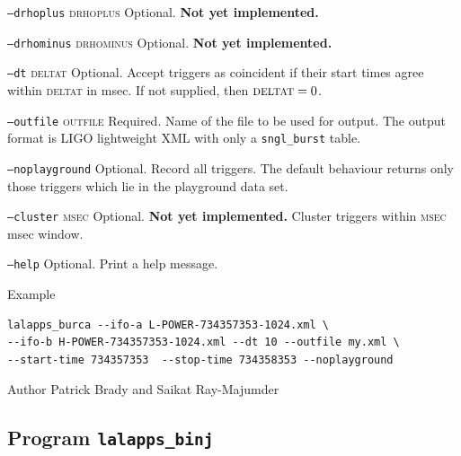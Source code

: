 \begin{entry}
\begin{entry}
\item[\texttt{--drhoplus} \textsc{drhoplus}] Optional.  \textbf{Not yet
implemented.}

\item[\texttt{--drhominus} \textsc{drhominus}] Optional. \textbf{Not yet
implemented.}

\item[\texttt{--dt} \textsc{deltat}] Optional. Accept triggers as coincident if
their start times agree within \textsc{deltat} in msec.  If not supplied,  then 
$\textsc{deltat} = 0$.

\item[\texttt{--outfile} \textsc{outfile}] Required.  Name of the file
to be used for output.  The output format is LIGO lightweight XML with
only a \texttt{sngl\_burst} table.

\item[\texttt{--noplayground}] Optional.  Record all triggers.  The
default behaviour returns only those triggers which lie in the
playground data set.  

\item[\texttt{--cluster} \textsc{msec}] Optional.  \textbf{Not yet
implemented.}  Cluster triggers within \textsc{msec} msec window.

\item[\texttt{--help}] Optional.  Print a help message.
\end{entry}

\item[Example]
\begin{verbatim}
lalapps_burca --ifo-a L-POWER-734357353-1024.xml \
--ifo-b H-POWER-734357353-1024.xml --dt 10 --outfile my.xml \
--start-time 734357353  --stop-time 734358353 --noplayground
\end{verbatim}
\item[Author] 
Patrick Brady and Saikat Ray-Majumder
\end{entry}
\clearpage

\subsection{Program \texttt{lalapps\_binj}}
\label{program:lalapps-binj}
\idx[Program]{lalapps\_binj}

